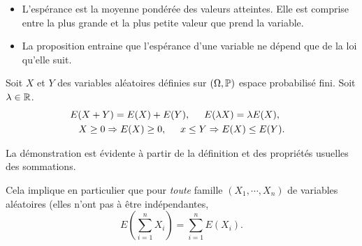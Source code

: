 \begin{rems}
\begin{itemize}
 \item L'espérance est la moyenne pondérée des valeurs atteintes. Elle est comprise entre la plus grande et la plus petite valeur que prend la variable.
 \item La proposition entraine que l'espérance d'une variable ne dépend que de la loi qu'elle suit. 
\end{itemize}
\end{rems}
\newpage
\begin{prop}
  Soit $X$ et $Y$ des variables aléatoires définies sur $(\Omega,\mathbb{P})$ espace probabilisé fini. Soit $\lambda \in \mathbb{R}$.
\begin{multline*}
  E(X + Y) = E(X) + E(Y), \hspace{0.5cm} E(\lambda X) = \lambda E(X),\hspace{0.5cm}\\
  X \geq 0 \Rightarrow E(X) \geq 0, \hspace{0.5cm} x \leq Y \Rightarrow E(X) \leq E(Y).
\end{multline*}
\end{prop}
\begin{demo}
  La démonstration est évidente à partir de la définition et des propriétés usuelles des sommations.
\end{demo}
\begin{rem}
Cela implique en particulier que pour \emph{toute} famille $(X_1, \cdots, X_n)$ de variables aléatoires (elles n'ont pas à être indépendantes,
\[
 E(\sum_{i=1}^{n}X_i) = \sum_{i=1}^nE(X_i).
\]  
\end{rem}

